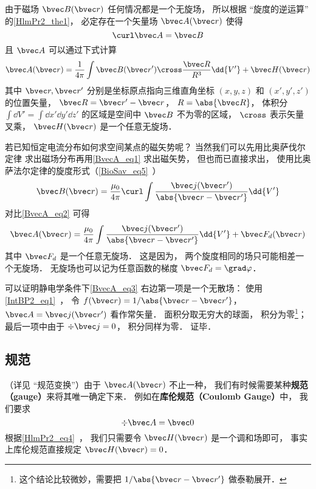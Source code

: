 
\begin{issues}
\issueDraft
{}
\end{issues}


由于磁场 $\bvec B(\bvec r)$ 任何情况都是一个无旋场， 所以根据 “旋度的逆运算” 的\autoref{HlmPr2_the1}， 必定存在一个矢量场 $\bvec A(\bvec r)$ 使得
\begin{equation}\label{BvecA_eq2}
\curl \bvec A = \bvec B
\end{equation}
且 $\bvec A$ 可以通过下式计算
\begin{equation}\label{BvecA_eq1}
\bvec A(\bvec r) = \frac{1}{4\pi} \int \bvec B(\bvec r') \cross \frac{\bvec R}{R^3} \dd{V'} + \bvec H(\bvec r)
\end{equation}
其中 $\bvec r, \bvec r'$ 分别是坐标原点指向三维直角坐标 $(x, y, z)$ 和 $(x', y', z')$ 的位置矢量， $\bvec R = \bvec r' - \bvec r$， $R = \abs{\bvec R}$， 体积分 $\int\dd{V'} = \int\dd{x'}\dd{y'}\dd{z'}$ 的区域是空间中 $\bvec B$ 不为零的区域， $\cross$ 表示矢量叉乘， $\bvec H(\bvec r)$ 是一个任意无旋场．

若已知恒定电流分布如何求空间某点的磁矢势呢？ 当然我们可以先用比奥萨伐尔定律 求出磁场分布再用\autoref{BvecA_eq1} 求出磁矢势， 但也而已直接求出， 使用比奥萨法尔定律的旋度形式（\autoref{BioSav_eq5}~）
\begin{equation}
\bvec B(\bvec r) = \frac{\mu_0}{4\pi} \curl \int \frac{\bvec j(\bvec r')}{\abs{\bvec r - \bvec r'}}\dd{V'}
\end{equation}
对比\autoref{BvecA_eq2} 可得
\begin{equation}\label{BvecA_eq3}
\bvec A(\bvec r) = \frac{\mu_0}{4\pi} \int \frac{\bvec j(\bvec r')}{\abs{\bvec r - \bvec r'}}\dd{V'} + \bvec F_{d}(\bvec r)
\end{equation}
其中 $\bvec F_d$ 是一个任意无旋场． 这是因为， 两个旋度相同的场只可能相差一个无旋场． 无旋场也可以记为任意函数的梯度 $\bvec F_d = \grad \varphi$．

可以证明静电学条件下\autoref{BvecA_eq3} 右边第一项是一个无散场： 使用\autoref{IntBP2_eq1}~， 令 $f(\bvec r) = 1/\abs{\bvec r - \bvec r'}$， $\bvec A = \bvec j(\bvec r')$ 看作常矢量． 面积分取无穷大的球面， 积分为零\footnote{这个结论比较微妙，需要把 $1/\abs{\bvec r - \bvec r'}$ 做泰勒展开．}； 最后一项中由于 $\div \bvec j = 0$， 积分同样为零． 证毕．

\subsection{规范}
（详见 “规范变换”）由于 $\bvec A(\bvec r)$ 不止一种， 我们有时候需要某种\textbf{规范（gauge）}来将其唯一确定下来． 例如在\textbf{库伦规范（Coulomb Gauge）}中， 我们要求
\begin{equation}
\div \bvec A = \bvec 0
\end{equation}
根据\autoref{HlmPr2_eq4}~， 我们只需要令 $\bvec H(\bvec r)$ 是一个调和场即可， 事实上库伦规范直接规定 $\bvec H(\bvec r) = 0$．
